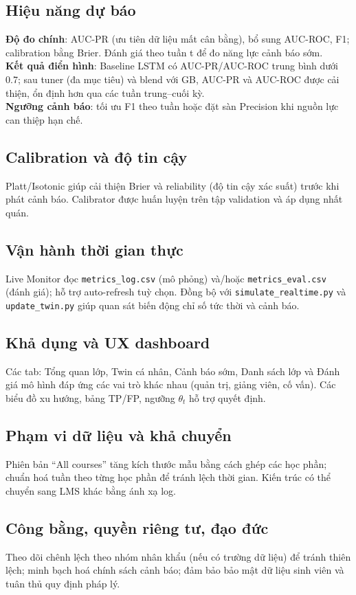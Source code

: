 \documentclass[12pt,a4paper]{article}
\begin{document}
\subsection{Hiệu năng dự báo} \label{sub:perf}
\textbf{Độ đo chính}: AUC-PR (ưu tiên dữ liệu mất cân bằng), bổ sung AUC-ROC, F1; calibration bằng Brier. Đánh giá theo tuần t để đo năng lực cảnh báo sớm.\\
\textbf{Kết quả điển hình}: Baseline LSTM có AUC-PR/AUC-ROC trung bình dưới 0.7; sau tuner (đa mục tiêu) và blend với GB, AUC-PR và AUC-ROC được cải thiện, ổn định hơn qua các tuần trung–cuối kỳ.\\
\textbf{Ngưỡng cảnh báo}: tối ưu F1 theo tuần hoặc đặt sàn Precision khi nguồn lực can thiệp hạn chế.

\subsection{Calibration và độ tin cậy}
Platt/Isotonic giúp cải thiện Brier và reliability (độ tin cậy xác suất) trước khi phát cảnh báo. Calibrator được huấn luyện trên tập validation và áp dụng nhất quán.

\subsection{Vận hành thời gian thực}
Live Monitor đọc \texttt{metrics\_log.csv} (mô phỏng) và/hoặc \texttt{metrics\_eval.csv} (đánh giá); hỗ trợ auto-refresh tuỳ chọn. Đồng bộ với \texttt{simulate\_realtime.py} và \texttt{update\_twin.py} giúp quan sát biến động chỉ số tức thời và cảnh báo.

\subsection{Khả dụng và UX dashboard}
Các tab: Tổng quan lớp, Twin cá nhân, Cảnh báo sớm, Danh sách lớp và Đánh giá mô hình đáp ứng các vai trò khác nhau (quản trị, giảng viên, cố vấn). Các biểu đồ xu hướng, bảng TP/FP, ngưỡng $\theta_t$ hỗ trợ quyết định.

\subsection{Phạm vi dữ liệu và khả chuyển}
Phiên bản “All courses” tăng kích thước mẫu bằng cách ghép các học phần; chuẩn hoá tuần theo từng học phần để tránh lệch thời gian. Kiến trúc có thể chuyển sang LMS khác bằng ánh xạ log.

\subsection{Công bằng, quyền riêng tư, đạo đức}
Theo dõi chênh lệch theo nhóm nhân khẩu (nếu có trường dữ liệu) để tránh thiên lệch; minh bạch hoá chính sách cảnh báo; đảm bảo bảo mật dữ liệu sinh viên và tuân thủ quy định pháp lý.
\end{document}
